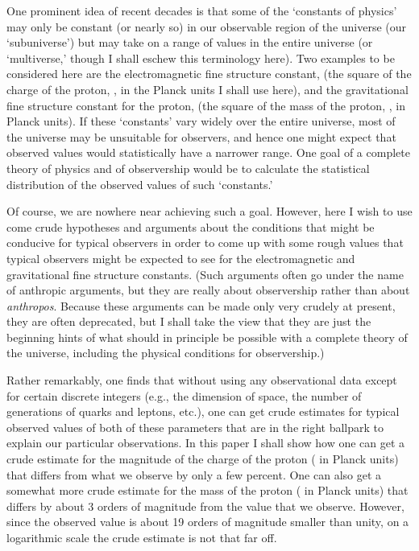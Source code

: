 \documentclass[a4paper,12pt]{article}
\begin{document}
	One prominent idea of recent decades is that
some of the `constants of physics' may only be constant
(or nearly so) in our observable region of the universe
(our `subuniverse')
but may take on a range of values in the entire universe
(or `multiverse,' though I shall eschew this terminology here).
Two examples to be considered here are the electromagnetic
fine structure constant, \coordHE{}
(the square of the charge of the proton, \coordHE{}, in
the Planck units \coordHE{}
I shall use here), 
and the gravitational fine structure constant for the proton,
\coordHE{}
(the square of the mass of the proton, \coordHE{}, in Planck units).
If these `constants' vary widely over the entire universe,
most of the universe may be unsuitable for observers,
and hence one might expect that observed values would
statistically have a narrower range.
One goal of a complete theory of physics and of observership
would be to calculate the statistical distribution of
the observed values of such `constants.'

	Of course, we are nowhere near achieving such a goal.
However, here I wish to use come crude hypotheses and arguments
about the conditions that might be conducive for typical observers
in order to come up with some rough values that typical observers
might be expected to see for the electromagnetic and gravitational
fine structure constants.  (Such arguments often go under the name
of anthropic arguments, but they are really about observership
rather than about {\it anthropos}.  Because these arguments can be made
only very crudely at present, they are often deprecated,
but I shall take the view that they are just the beginning hints
of what should in principle be possible with a complete theory
of the universe, including the physical conditions for observership.)

	Rather remarkably, one finds that
without using any observational data except for certain discrete
integers (e.g., the dimension of space, the number of generations
of quarks and leptons, etc.), one can get crude estimates
for typical observed values of both of these parameters
that are in the right ballpark to explain our particular observations.
In this paper I shall show how one can get a crude estimate
for the magnitude of the charge of the proton
(\coordHE{} in Planck units)
that differs from what we observe by only a few percent.
One can also get a somewhat more crude estimate
for the mass of the proton (\coordHE{} in Planck units)
that differs by about 3 orders of magnitude
from the value that we observe.
However, since the observed value is about 19 orders
of magnitude smaller than unity,
on a logarithmic scale the crude estimate is not that far off.
\end{document}
